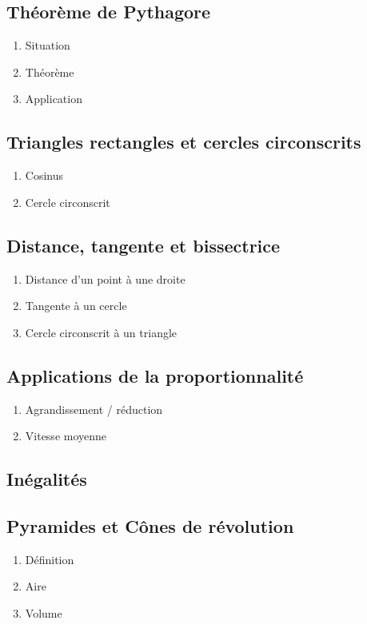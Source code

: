 \subsection{Théorème de Pythagore}\label{ch_4_pyth}
\begin{enumerate}
	\item Situation
	\item Théorème
	\item Application
\end{enumerate}

\subsection{Triangles rectangles et cercles circonscrits}\label{ch_4_tr_circ}
\begin{enumerate}
	\item Cosinus
	\item Cercle circonscrit
\end{enumerate}

\subsection{Distance, tangente et bissectrice}\label{ch_4_dist}
\begin{enumerate}
	\item Distance d'un point à une droite
	\item Tangente à un cercle
	\item Cercle circonscrit à un triangle
\end{enumerate}

\subsection{Applications de la proportionnalité}\label{ch_4_prop_app}
\begin{enumerate}
	\item Agrandissement / réduction
	\item Vitesse moyenne
\end{enumerate}
	


\subsection{Inégalités}\label{ch_4_ineg}

\subsection{Pyramides et Cônes de révolution}\label{ch_4_pyr}

\begin{enumerate}
	\item Définition
	\item Aire
	\item Volume
\end{enumerate}